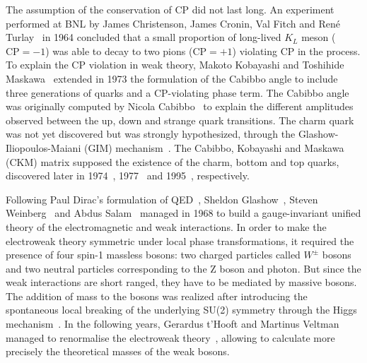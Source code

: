 The assumption of the conservation of CP did not last long. An experiment performed at BNL by James Christenson, James Cronin, Val Fitch and Ren{\'e} Turlay~\cite{KMeson} in 1964 concluded that a small proportion of long-lived $K_{L}$ meson ($\text{CP}=-1$) was able to decay to two pions ($\text{CP}=+1$) violating CP in the process. To explain the CP violation in weak theory, Makoto Kobayashi and Toshihide Maskawa~\cite{CKMMatrix} extended in 1973 the formulation of the Cabibbo angle to include three generations of quarks and a CP-violating phase term. The Cabibbo angle was originally computed by Nicola Cabibbo~\cite{CabibboMatrix} to explain the different amplitudes observed between the up, down and strange quark transitions. The charm quark was not yet discovered but was strongly hypothesized, through the Glashow-Iliopoulos-Maiani (GIM) mechanism~\cite{GIM}. The Cabibbo, Kobayashi and Maskawa (CKM) matrix supposed the existence of the charm, bottom and top quarks, discovered later in 1974~\cite{JPsiDiscovery,JPsiDiscovery_2}, 1977~\cite{BottomQuarkDiscovery} and 1995~\cite{TopQuarkDiscovery}, respectively.

Following Paul Dirac's formulation of QED~\cite{DiracQED}, Sheldon Glashow~\cite{Glashow:1959wxa}, Steven Weinberg~\cite{Weinberg:1967tq} and Abdus Salam~\cite{Salam:1959zz} managed in 1968 to build a gauge-invariant unified theory of the electromagnetic and weak interactions. In order to make the electroweak theory symmetric under local phase transformations, it required the presence of four spin-1 massless bosons: two charged particles called $W^{\pm}$ bosons and two neutral particles corresponding to the Z boson and photon. But since the weak interactions are short ranged, they have to be mediated by massive bosons. The addition of mass to the bosons was realized after introducing the spontaneous local breaking of the underlying SU(2) symmetry through the Higgs mechanism~\cite{HiggsMechanism_1,HiggsMechanism_2}. In the following years, Gerardus t'Hooft and Martinus Veltman managed to renormalise the electroweak theory~\cite{Renormalization_1,Renormalization_2}, allowing to calculate more precisely the theoretical masses of the weak bosons.

